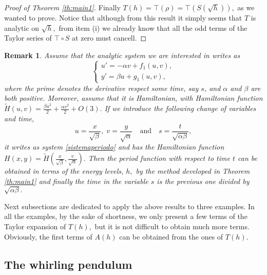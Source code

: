 \documentclass[12pt,a4paper,reqno]{amsart}
\newtheorem{rem}[teo]{Remark}
\begin{document}
\begin{proof}[Proof of Theorem \ref{th:main1}]
Finally $T(h)= \top(\rho)=\top(S(\sqrt h)),$ as we wanted to prove.
Notice that although from this result it simply seems that $T$ is
analytic on $\sqrt h,$ from item (i) we already know that all the
odd terms of the Taylor series of $\top\circ S$ at zero must
cancell.
\end{proof}


\begin{rem}\label{re:rem1} Assume that the analytic system we are interested in writes as
    \begin{equation*}
\left\{ \begin{array}{l}
u'= - \alpha v + f_1(u,v) ,\\
y'= \beta u + g_1(u,v),
\end{array} \right.
\end{equation*}
where the prime denotes the derivative respect some time, say $s$,
and $\alpha$ and $\beta$ are both positive. Moreover, assume that it
is Hamiltonian, with Hamiltonian function $\widetilde{H}(u,v)=
\frac{\beta u^2}{2}
    + \frac{\alpha v^2}{2} +O(3).$ If we introduce the following
change of variables and time,
\begin{equation}\label{mudancavariaveis}
u=\frac{x}{\sqrt{\beta}}, \; v=\frac{y}{\sqrt{\alpha}} \quad
\mbox{and} \quad s=\frac{t}{\sqrt{\alpha \beta}},
\end{equation}
it writes as system \eqref{sistemaperiodo} and has the Hamiltonian
function $H(x,y)=\widetilde{H}
  \left( \frac{x}{\sqrt{\beta}},\frac{v}{\sqrt{\alpha}} \right).$  Then the period function with respect to time $t$ can be obtained in
  terms of the  energy levels, $ h,$ by the method developed in Theorem \ref{th:main1} and finally the time in the variable  $ s $
  is the previous one divided  by $ \sqrt {\alpha \beta }.$
\end{rem}


Next subsections are  dedicated to apply the above results to three
examples. In all the examples, by the sake of shortness, we only
present a few terms of the Taylor expansion of $T(h),$ but it is not
difficult to obtain much more terms. Obviously, the first terms of
$A(h)$ can be obtained from the ones of $T(h).$



\subsection{The whirling pendulum}%
\end{document}
